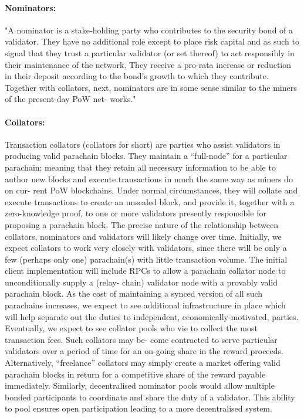 \paragraph{Nominators:} "A nominator is a stake-holding party who contributes to the security bond of a validator. They have no additional role except to place risk capital and as such to signal that they trust a particular validator (or set thereof) to act responsibly in their maintenance of the network. They receive a pro-rata increase or reduction in their deposit according to the bond’s growth to which they contribute.
Together with collators, next, nominators are in some sense similar to the miners of the present-day PoW net- works."

\paragraph{Collators: } Transaction collators (collators for short) are parties who assist validators in producing valid parachain blocks. They maintain a “full-node” for a particular parachain; meaning that they retain all necessary information to be able to author new blocks and execute transactions in much the same way as miners do on cur- rent PoW blockchains. Under normal circumstances, they will collate and execute transactions to create an unsealed block, and provide it, together with a zero-knowledge proof, to one or more validators presently responsible for proposing a parachain block.
The precise nature of the relationship between collators, nominators and validators will likely change over time. Initially, we expect collators to work very closely with validators, since there will be only a few (perhaps only one) parachain(s) with little transaction volume. The initial client implementation will include RPCs to allow a parachain collator node to unconditionally supply a (relay- chain) validator node with a provably valid parachain block. As the cost of maintaining a synced version of all such parachains increases, we expect to see additional infrastructure in place which will help separate out the duties to independent, economically-motivated, parties.
Eventually, we expect to see collator pools who vie to collect the most transaction fees. Such collators may be- come contracted to serve particular validators over a period of time for an on-going share in the reward proceeds. Alternatively, “freelance” collators may simply create a market offering valid parachain blocks in return for a competitive share of the reward payable immediately. Similarly, decentralised nominator pools would allow multiple bonded participants to coordinate and share the duty of a validator. This ability to pool ensures open participation leading to a more decentralised system.

